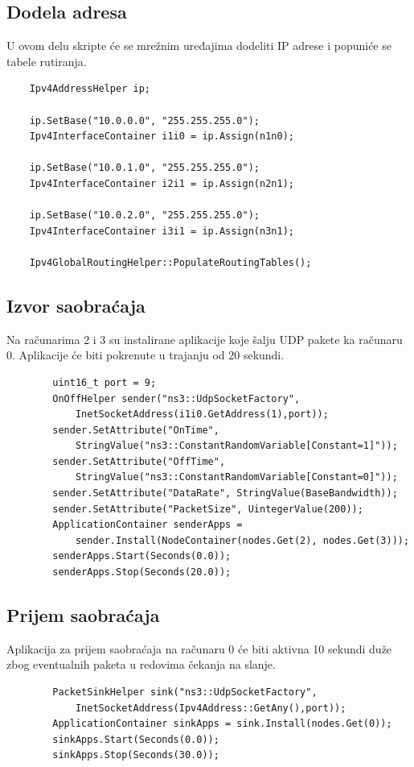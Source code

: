 \documentclass[a4paper, 12pt, projekat]{etf}
\begin{document}
	\subsection{Dodela adresa}
	U ovom delu skripte će se mrežnim uređajima dodeliti IP adrese i popuniće se tabele rutiranja.
	\begin{verbatim}
	Ipv4AddressHelper ip;
	
	ip.SetBase("10.0.0.0", "255.255.255.0");
	Ipv4InterfaceContainer i1i0 = ip.Assign(n1n0);
	
	ip.SetBase("10.0.1.0", "255.255.255.0");
	Ipv4InterfaceContainer i2i1 = ip.Assign(n2n1);
	
	ip.SetBase("10.0.2.0", "255.255.255.0");
	Ipv4InterfaceContainer i3i1 = ip.Assign(n3n1);
	
	Ipv4GlobalRoutingHelper::PopulateRoutingTables();
	\end{verbatim}
	\subsection{Izvor saobraćaja}
	Na računarima 2 i 3 su instalirane aplikacije koje šalju UDP pakete ka računaru 0. Aplikacije će biti pokrenute u trajanju od 20 sekundi.
	\begin{verbatim}
		uint16_t port = 9;
		OnOffHelper sender("ns3::UdpSocketFactory",
		    InetSocketAddress(i1i0.GetAddress(1),port));
		sender.SetAttribute("OnTime", 
		    StringValue("ns3::ConstantRandomVariable[Constant=1]"));
		sender.SetAttribute("OffTime", 
		    StringValue("ns3::ConstantRandomVariable[Constant=0]"));
		sender.SetAttribute("DataRate", StringValue(BaseBandwidth));
		sender.SetAttribute("PacketSize", UintegerValue(200));
		ApplicationContainer senderApps = 
		    sender.Install(NodeContainer(nodes.Get(2), nodes.Get(3)));
		senderApps.Start(Seconds(0.0));
		senderApps.Stop(Seconds(20.0));
	\end{verbatim}
	\subsection{Prijem saobraćaja}
	Aplikacija za prijem saobraćaja na računaru 0 će biti aktivna 10 sekundi duže zbog eventualnih paketa u redovima čekanja na slanje.
	\begin{verbatim}
		PacketSinkHelper sink("ns3::UdpSocketFactory",
		    InetSocketAddress(Ipv4Address::GetAny(),port));
		ApplicationContainer sinkApps = sink.Install(nodes.Get(0));
		sinkApps.Start(Seconds(0.0));
		sinkApps.Stop(Seconds(30.0));
	\end{verbatim}
\end{document}
